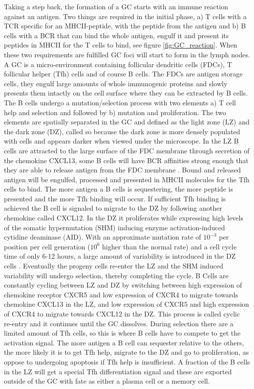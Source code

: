 Taking a step back, the formation of a GC starts with an immune reaction against an antigen.
Two things are required in the initial phase, a) T cells with a TCR specific for an MHCII-peptide, with the peptide from the antigen and b) B cells with a BCR that can bind the whole antigen, engulf it and present its peptides in MHCII for the T cells to bind, see figure \ref{fig:GC_reaction}.
When these two requirements are fulfilled GC foci will start to form in the lymph nodes.
A GC is a micro-environment containing follicular dendritic cells (FDCs), T follicular helper (Tfh) cells and of course B cells.
The FDCs are antigen storage cells, they engulf large amounts of whole immunogenic proteins and slowly presents them intactly on the cell surface where they can be extracted by B cells.
The B cells undergo a mutation/selection process with two elements a) T cell help and selection and followed by b) mutation and proliferation.
The two elements are spatially separated in the GC and defined as the light zone (LZ) and the dark zone (DZ), called so because the dark zone is more densely populated with cells and appears darker when viewed under the microscope.
In the LZ B cells are attracted to the large surface of the FDC membrane through secretion of the chemokine CXCL13, some B cells will have BCR affinities strong enough that they are able to release antigen from the FDC membrane \cite{suzuki2009visualizing}.
Bound and released antigen will be engulfed, processed and presented in MHCII molecules for the Tfh cells to bind.
The more antigen a B cells is sequestering, the more peptide is presented and the more Tfh binding will occur.
If sufficient Tfh binding is achieved the B cell is signaled to migrate to the DZ by following another chemokine called CXCL12.
In the DZ it proliferates while expressing high levels of the somatic hypermutation (SHM) inducing enzyme activation-induced cytidine deaminase (AID).
With an approximate mutation rate of $10^{-3}$ per position per cell generation ($10^{6}$ higher than the normal rate) and a cell cycle time of only 6-12 hours, a large amount of variability is introduced in the DZ cells \cite{victora2012germinal}.
Eventually the progeny cells re-enter the LZ and the SHM induced variability will undergo selection, thereby completing the cycle.
B Cells are constantly cycling between LZ and DZ by switching between high expression of chemokine receptor CXCR5 and low expression of CXCR4 to migrate towards chemokine CXCL13 in the LZ, and low expression of CXCR5 and high expression of CXCR4 to migrate towards CXCL12 in the DZ.
This process is called cyclic re-entry and it continues until the GC dissolves.
During selection there are a limited amount of Tfh cells, so this is where B cells have to compete to get the activation signal.
The more antigen a B cell can sequester relative to the others, the more likely it is to get Tfh help, migrate to the DZ and go to proliferation, as oppose to undergoing apoptosis if Tfh help is insufficient.
A fraction of the B cells in the LZ will get a special Tfh differentiation signal and these are exported outside of the GC with fate as either a plasma cell or a memory cell.

